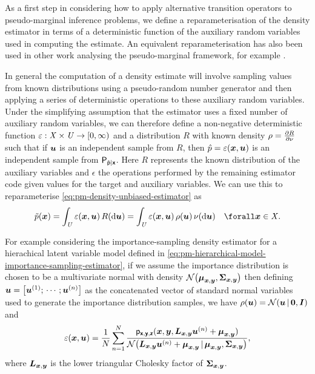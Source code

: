 As a first step in considering how to apply alternative transition operators to pseudo-marginal inference problems, we define a reparameterisation of the density estimator in terms of a deterministic function of the auxiliary random variables used in computing the estimate. An equivalent reparameterisation has also been used in other work analysing the pseudo-marginal framework, for example \citep{doucet2015efficient}.

In general the computation of a density estimate will involve sampling values from known distributions using a pseudo-random number generator and then applying a series of deterministic operations to these auxiliary random variables. Under the simplifying assumption that the estimator uses a fixed number of auxiliary random variables, we can therefore define a non-negative deterministic function $\varepsilon : \mathit{X} \times \mathit{U} \to [0,\infty)$ and a distribution $R$ with known density $\rho = \frac{\partial R}{\partial \nu}$ such that if $\boldsymbol{u}$ is an independent sample from $R$, then $\hat{p} = \varepsilon(\boldsymbol{x},\boldsymbol{u})$ is an independent sample from $\mathsf{P}_{\hat{\mathsf{p}}|\boldsymbol{\mathsf{x}}}$. Here $R$ represents the known distribution of the auxiliary variables and $\epsilon$ the operations performed by the remaining estimator code given values for the target and auxiliary variables. We can use this to reparameterise \eqref{eq:pm-density-unbiased-estimator} as
\begin{equation}\label{eq:density-unbiased-estimator-property}
  \utgtdens(\vct{x}) =
  \int_{\set{U}} \esttgtdens(\vct{x},\vct{u})\,R(\dr\vct{u}) =
  \int_{\set{U}} \esttgtdens(\vct{x},\vct{u})\,\rho(\vct{u})\,\nu(\dr\vct{u})
  \quad \forall \vct{x} \in \set{X}.
\end{equation}

For example considering the importance-sampling density estimator for a hierachical latent variable model defined in \eqref{eq:pm-hierarchical-model-importance-sampling-estimator}, if we assume the importance distribution is chosen to be a multivariate normal with density $\nrm{\vct{\mu}_{\vct{x},\vct{y}},\mtx{\Sigma}_{\vct{x},\vct{y}}}$ then defining $\vct{u} = \lsb \vct{u}^{(1)}; \,\cdots\,; \vct{u}^{(n)}\rsb$ as the concatenated vector of standard normal variables used to generate the importance distribution samples, we have $\rho(\vct{u}) = \nrm{\vct{u}\gvn\vct{0},\mtx{I}}$ and
\begin{equation}\label{eq:importance-sampling-density-estimator-reparameterisation}
  \esttgtdens(\vct{x},\vct{u}) = \frac{1}{N} \sum_{n=1}^N
  \frac
    {\pden{\rvct{x},\rvct{y},\rvct{z}}(\vct{x},\vct{y},\mtx{L}_{\vct{x},\vct{y}}\vct{u}^{(n)} + \vct{\mu}_{\vct{x},\vct{y}})}
    {\nrm{\mtx{L}_{\vct{x},\vct{y}}\vct{u}^{(n)} + \vct{\mu}_{\vct{x},\vct{y}} \gvn \vct{\mu}_{\vct{x},\vct{y}},\mtx{\Sigma}_{\vct{x},\vct{y}}}},
\end{equation}
where $\boldsymbol{L}_{\boldsymbol{x},\boldsymbol{y}}$ is the lower triangular Cholesky factor of $\boldsymbol{\Sigma}_{\boldsymbol{x},\boldsymbol{y}}$.

